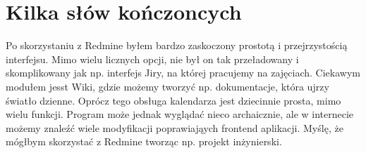 \documentclass{article}
\begin{document}
\section{Kilka słów kończoncych}
Po skorzystaniu z Redmine byłem bardzo zaskoczony prostotą i przejrzystością
interfejsu. Mimo wielu licznych opcji, nie był on tak przeładowany
i skomplikowany jak np. interfejs Jiry, na której pracujemy na 
zajęciach. Ciekawym modułem jesst Wiki, gdzie możemy tworzyć
np. dokumentacje, która ujrzy światło dzienne. Oprócz tego
obsługa kalendarza jest dziecinnie prosta, mimo wielu
funkcji. Program może jednak wyglądać nieco archaicznie, ale 
w internecie możemy znaleźć wiele modyfikacji poprawiająych
frontend aplikacji. Myślę, że mógłbym skorzystać z Redmine tworząc
np. projekt inżynierski.
\end{document}
